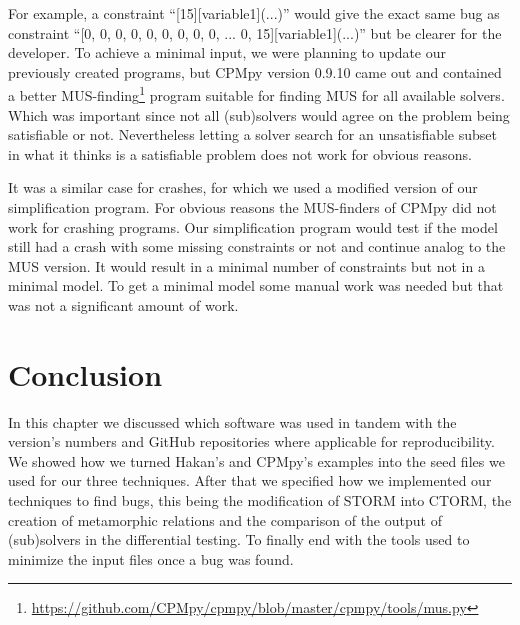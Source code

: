 For example, a constraint “[15][variable1](...)” would give the exact same bug as constraint “[0, 0, 0, 0, 0, 0, 0, 0, 0, ... 0, 15][variable1](...)” but be clearer for the developer. To achieve a minimal input, we were planning to update our previously created programs, but CPMpy version 0.9.10 came out and contained a better MUS-finding\footnote{\url{https://github.com/CPMpy/cpmpy/blob/master/cpmpy/tools/mus.py}} program  suitable for finding MUS for all available solvers. Which was important since not all (sub)solvers would agree on the problem being satisfiable or not. Nevertheless letting a solver search for an unsatisfiable subset in what it thinks is a satisfiable problem does not work for obvious reasons.


It was a similar case for crashes, for which we used a modified version of our simplification program. For obvious reasons the MUS-finders of CPMpy did not work for crashing programs. Our simplification program would test if the model still had a crash with some missing constraints or not and continue analog to the MUS version. It would result in a minimal number of constraints but not in a minimal model. To get a minimal model some manual work was needed but that was not a significant amount of work. 



\section{Conclusion}
\label{impl:conclusion}
In this chapter we discussed which software was used in tandem with the version’s numbers and GitHub repositories where applicable for reproducibility. We showed how we turned Hakan’s and CPMpy’s examples into the seed files we used for our three techniques. After that we specified how we implemented our techniques to find bugs, this being the modification of STORM into CTORM, the creation of metamorphic relations and the comparison of the output of (sub)solvers in the differential testing. To finally end with the tools used to minimize the input files once a bug was found.



